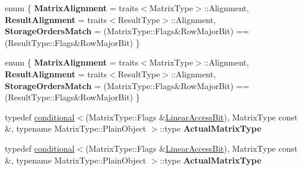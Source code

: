 \begin{DoxyCompactItemize}
\item 
\mbox{\label{struct_eigen_1_1internal_1_1compute__inverse__size4_3_01_architecture_1_1_s_s_e_00_01double_00_0ae07abd87bb6c7ddc3170cf276579ed0_a9b4dfddd68cef1a9487446c5c01c9ca9}} 
enum \{ {\bfseries Matrix\+Alignment} = traits$<$Matrix\+Type$>$\+:\+:Alignment, 
{\bfseries Result\+Alignment} = traits$<$Result\+Type$>$\+:\+:Alignment, 
{\bfseries Storage\+Orders\+Match} = (Matrix\+Type\+:\+:Flags\&Row\+Major\+Bit) == (Result\+Type\+:\+:Flags\&Row\+Major\+Bit)
 \}
\item 
\mbox{\label{struct_eigen_1_1internal_1_1compute__inverse__size4_3_01_architecture_1_1_s_s_e_00_01double_00_0ae07abd87bb6c7ddc3170cf276579ed0_aa92d1074bb9e6a07f52b4ceb364f3a8c}} 
enum \{ {\bfseries Matrix\+Alignment} = traits$<$Matrix\+Type$>$\+:\+:Alignment, 
{\bfseries Result\+Alignment} = traits$<$Result\+Type$>$\+:\+:Alignment, 
{\bfseries Storage\+Orders\+Match} = (Matrix\+Type\+:\+:Flags\&Row\+Major\+Bit) == (Result\+Type\+:\+:Flags\&Row\+Major\+Bit)
 \}
\item 
\mbox{\label{struct_eigen_1_1internal_1_1compute__inverse__size4_3_01_architecture_1_1_s_s_e_00_01double_00_0ae07abd87bb6c7ddc3170cf276579ed0_a8c192b289cb1e6467ea937d742232706}} 
typedef \hyperlink{struct_eigen_1_1internal_1_1conditional}{conditional}$<$(Matrix\+Type\+::\+Flags \&\hyperlink{group__flags_ga4b983a15d57cd55806df618ac544d09e}{Linear\+Access\+Bit}), Matrix\+Type const \&, typename Matrix\+Type\+::\+Plain\+Object $>$\+::type {\bfseries Actual\+Matrix\+Type}
\item 
\mbox{\label{struct_eigen_1_1internal_1_1compute__inverse__size4_3_01_architecture_1_1_s_s_e_00_01double_00_0ae07abd87bb6c7ddc3170cf276579ed0_a8c192b289cb1e6467ea937d742232706}} 
typedef \hyperlink{struct_eigen_1_1internal_1_1conditional}{conditional}$<$(Matrix\+Type\+::\+Flags \&\hyperlink{group__flags_ga4b983a15d57cd55806df618ac544d09e}{Linear\+Access\+Bit}), Matrix\+Type const \&, typename Matrix\+Type\+::\+Plain\+Object $>$\+::type {\bfseries Actual\+Matrix\+Type}
\end{DoxyCompactItemize}
